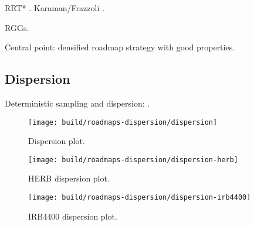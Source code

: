 RRT* \citep{karaman2010rrtstar}.
Karaman/Frazzoli \citep{karaman2011samplingoptimal}.

RGGs.

Central point: densified roadmap strategy with good properties.

\subsection{Dispersion}

Deterministic sampling and dispersion:
\citep{janson2015deterministicsampling}.

\begin{figure}
   \centering
   \texttt{[image: build/roadmaps-dispersion/dispersion]}
   \caption{Dispersion plot.}
\end{figure}

\begin{figure}
   \centering
   \texttt{[image: build/roadmaps-dispersion/dispersion-herb]}
   \caption{HERB dispersion plot.}
\end{figure}

\begin{figure}
   \centering
   \texttt{[image: build/roadmaps-dispersion/dispersion-irb4400]}
   \caption{IRB4400 dispersion plot.}
\end{figure}
